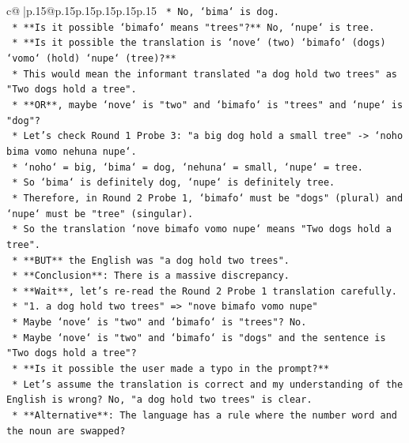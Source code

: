 \documentclass{article}
\begin{document}
{\begin{supertabular}{c@{$\;$}|p{.15\linewidth}@{}p{.15\linewidth}p{.15\linewidth}p{.15\linewidth}p{.15\linewidth}p{.15\linewidth}}
{{{\texttt{            *   No, `bima` is dog.} \\
\texttt{            *   **Is it possible `bimafo` means "trees"?** No, `nupe` is tree.} \\
\texttt{            *   **Is it possible the translation is `nove` (two) `bimafo` (dogs) `vomo` (hold) `nupe` (tree)?**} \\
\texttt{            *   This would mean the informant translated "a dog hold two trees" as "Two dogs hold a tree".} \\
\texttt{            *   **OR**, maybe `nove` is "two" and `bimafo` is "trees" and `nupe` is "dog"?} \\
\texttt{            *   Let's check Round 1 Probe 3: "a big dog hold a small tree" {-}> `noho bima vomo nehuna nupe`.} \\
\texttt{            *   `noho` = big, `bima` = dog, `nehuna` = small, `nupe` = tree.} \\
\texttt{            *   So `bima` is definitely dog, `nupe` is definitely tree.} \\
\texttt{            *   Therefore, in Round 2 Probe 1, `bimafo` must be "dogs" (plural) and `nupe` must be "tree" (singular).} \\
\texttt{            *   So the translation `nove bimafo vomo nupe` means "Two dogs hold a tree".} \\
\texttt{            *   **BUT** the English was "a dog hold two trees".} \\
\texttt{            *   **Conclusion**: There is a massive discrepancy.} \\
\texttt{            *   **Wait**, let's re{-}read the Round 2 Probe 1 translation carefully.} \\
\texttt{            *   "1. a dog hold two trees" => "nove bimafo vomo nupe"} \\
\texttt{            *   Maybe `nove` is "two" and `bimafo` is "trees"? No.} \\
\texttt{            *   Maybe `nove` is "two" and `bimafo` is "dogs" and the sentence is "Two dogs hold a tree"?} \\
\texttt{            *   **Is it possible the user made a typo in the prompt?**} \\
\texttt{            *   Let's assume the translation is correct and my understanding of the English is wrong? No, "a dog hold two trees" is clear.} \\
\texttt{            *   **Alternative**: The language has a rule where the number word and the noun are swapped?} \\
}}}
\end{supertabular}}
\end{document}
